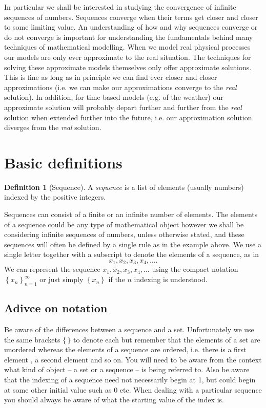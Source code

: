 \documentclass[extrafontsizes, twoside, a4paper]{memoir}
\theoremstyle{plain}%
\theoremstyle{definition}
\newtheorem{defn}{Definition}[chapter]
\theoremstyle{remark}
\begin{document}
In particular we shall be interested in studying the convergence of infinite sequences of numbers. Sequences converge when their terms get closer and closer to some limiting value. An understanding of how and why sequences converge or do not converge is important for understanding the fundamentals behind many techniques of mathematical modelling. When we model real physical processes our models are only ever approximate to the real situation. The techniques for solving these approximate models themselves only offer approximate solutions. This is fine as long as in principle we can find ever closer and closer approximations (i.e. we can make our approximations converge to the \emph{real} solution). In addition, for time based models (e.g. of the weather) our approximate solution will probably depart further and further from the \emph{real} solution when extended further into the future, i.e. our approximation solution diverges from the \emph{real} solution.
\section{Basic definitions}
\begin{defn}[Sequence]
A \emph{sequence} is a list of elements (usually numbers) indexed by the positive integers.
\end{defn}
Sequences can consist of a finite or an infinite number of elements. The elements of a
sequence could be any type of mathematical object however we shall be considering
infinite sequences of numbers, unless otherwise stated, and these sequences will often be
defined by a single rule as in the example above. We use a single letter together with a
subscript to denote the elements of a sequence, as in
$$x_1 , x_2 , x_3 , x_4, \dots .$$
We can represent the sequence $x_1 , x_2 , x_3 , x_4, \dots $ using the compact notation $\left \{ x_n \right \}_{n=1}^\infty$  or just simply $\left \{ x_n \right \}$ if the $n$ indexing is understood.

\subsection*{Adivce on notation}
Be aware of the differences between a sequence and a set. Unfortunately we use the same brackets $\{ \, \}$ to denote each but remember that the elements of a set are unordered whereas the elements of a sequence are ordered, i.e. there is a first element , a second element and so on. You will need to be aware from the context what kind of object -- a set or a sequence -- is being referred to. Also be aware that the indexing of a sequence need not necessarily begin at 1, but could begin at some other initial value such as 0 etc. When dealing with a particular sequence you should always be aware of what the starting value of the index is.
\end{document}
